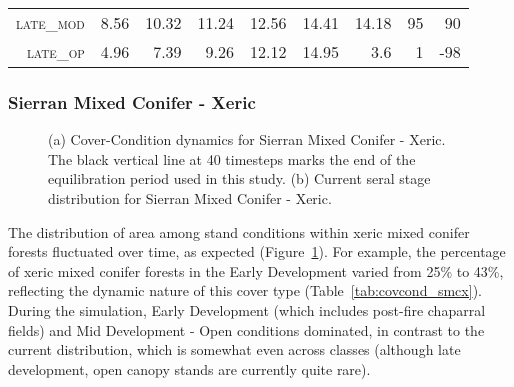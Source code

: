 \begin{table}[!htbp]
\begin{tabular}{@{}rrrrrr|rrr@{}}
\footnotesize \textsc{late\_mod }        & \footnotesize  8.56        & \footnotesize 10.32   & \footnotesize 11.24     & \footnotesize 12.56   & \footnotesize 14.41     & \footnotesize 14.18    & \footnotesize 95    & \footnotesize 90      \\
\footnotesize \textsc{late\_op  }        & \footnotesize  4.96        & \footnotesize 7.39    & \footnotesize 9.26      & \footnotesize 12.12   & \footnotesize 14.95     & \footnotesize 3.6      & \footnotesize 1     & \footnotesize -98      \\
  \hline
\end{tabular}
\end{table}





\clearpage
\subsubsection{Sierran Mixed Conifer - Xeric}


\begin{figure}[!htbp]
  \centering
  \caption{(a) Cover-Condition dynamics for Sierran Mixed Conifer - Xeric. The black vertical line at 40 timesteps marks the end of the equilibration period used in this study. (b) Current seral stage distribution for Sierran Mixed Conifer - Xeric.} 
  \label{fig:covcond_smcx}
\end{figure}

The distribution of area among stand conditions within xeric mixed conifer forests fluctuated over time, as expected (Figure~\ref{fig:covcond_smcx}). For example, the percentage of xeric mixed conifer forests in the Early Development varied from 25\% to 43\%, reflecting the dynamic nature of this cover type (Table~\ref{tab:covcond_smcx}). During the simulation, Early Development (which includes post-fire chaparral fields) and Mid Development - Open conditions dominated, in contrast to the current distribution, which is somewhat even across classes (although late development, open canopy stands are currently quite rare).  %


